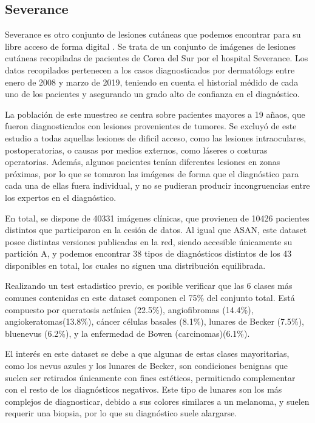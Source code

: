 \subsection{Severance}

Severance es otro conjunto de lesiones cutáneas que podemos encontrar para su libre acceso de forma digital \cite{severance}. Se trata de un conjunto de imágenes de lesiones cutáneas recopiladas de pacientes de Corea del Sur por el hospital Severance.  Los datos recopilados pertenecen a los casos diagnosticados por dermatólogs entre enero de 2008 y marzo de 2019, teniendo en cuenta el historial médido de cada uno de los pacientes y asegurando un grado alto de confianza en el diagnóstico.

La población de este muestreo se centra sobre pacientes mayores a 19 añaos, que fueron diagnosticados con lesiones provenientes de tumores. Se excluyó de este estudio a todas aquellas lesiones de dificil acceso, como las lesiones intraoculares, postoperatorias, o causas por medios externos, como láseres o costuras operatorias. Además, algunos pacientes tenían diferentes lesiones en zonas próximas, por lo que se tomaron las imágenes de forma que el diagnóstico para cada una de ellas fuera individual, y no se pudieran producir incongruencias entre los expertos en el diagnóstico. 

En total, se dispone de 40331 imágenes clínicas, que provienen de 10426 pacientes distintos que participaron en la cesión de datos. Al igual que ASAN, este dataset posee distintas versiones publicadas en la red, siendo accesible únicamente su partición A, y podemos encontrar 38 tipos de diagnósticos distintos de los 43 disponibles en total,  los cuales no siguen una distribución equilibrada.

Realizando un test estadistico previo, es posible verificar que las 6 clases más comunes contenidas en este dataset componen el 75\% del conjunto total. Está compuesto por queratosis actínica (22.5\%), angiofibromas (14.4\%), angiokeratomas(13.8\%), cáncer células basales (8.1\%), lunares de Becker (7.5\%), bluenevus (6.2\%), y la enfermedad de Bowen (carcinomas)(6.1\%).

El interés en este dataset se debe a que algunas de estas clases mayoritarias, como los nevus azules y los lunares de Becker, son condiciones benignas que suelen ser retirados únicamente con fines estéticos, permitiendo complementar con el resto de los diagnósticos negativos. Este tipo de lunares son los más complejos de diagnosticar, debido a sus colores similares a un melanoma, y suelen requerir una biopsia, por lo que su diagnóstico suele alargarse.

